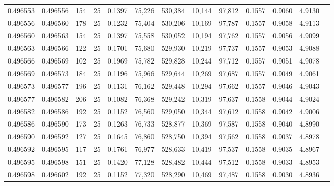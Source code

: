 \begin{tabular}{rrrrrrrrrrrrr}
0.496553 & 0.496556 & 154 &  25 &                                     0.1397 &  75,226 & 530,384 &  10,144 &  97,812 & 0.1557 & 0.9060 & 4.9130 \\
0.496556 & 0.496560 & 178 &  25 &                                     0.1232 &  75,404 & 530,206 &  10,169 &  97,787 & 0.1557 & 0.9058 & 4.9113 \\
0.496560 & 0.496563 & 154 &  25 &                                     0.1397 &  75,558 & 530,052 &  10,194 &  97,762 & 0.1557 & 0.9056 & 4.9099 \\
0.496563 & 0.496566 & 122 &  25 &                                     0.1701 &  75,680 & 529,930 &  10,219 &  97,737 & 0.1557 & 0.9053 & 4.9088 \\
0.496566 & 0.496569 & 102 &  25 &                                     0.1969 &  75,782 & 529,828 &  10,244 &  97,712 & 0.1557 & 0.9051 & 4.9078 \\
0.496569 & 0.496573 & 184 &  25 &                                     0.1196 &  75,966 & 529,644 &  10,269 &  97,687 & 0.1557 & 0.9049 & 4.9061 \\
0.496573 & 0.496577 & 196 &  25 &                                     0.1131 &  76,162 & 529,448 &  10,294 &  97,662 & 0.1557 & 0.9046 & 4.9043 \\
0.496577 & 0.496582 & 206 &  25 &                                     0.1082 &  76,368 & 529,242 &  10,319 &  97,637 & 0.1558 & 0.9044 & 4.9024 \\
0.496582 & 0.496586 & 192 &  25 &                                     0.1152 &  76,560 & 529,050 &  10,344 &  97,612 & 0.1558 & 0.9042 & 4.9006 \\
0.496586 & 0.496590 & 173 &  25 &                                     0.1263 &  76,733 & 528,877 &  10,369 &  97,587 & 0.1558 & 0.9040 & 4.8990 \\
0.496590 & 0.496592 & 127 &  25 &                                     0.1645 &  76,860 & 528,750 &  10,394 &  97,562 & 0.1558 & 0.9037 & 4.8978 \\
0.496592 & 0.496595 & 117 &  25 &                                     0.1761 &  76,977 & 528,633 &  10,419 &  97,537 & 0.1558 & 0.9035 & 4.8967 \\
0.496595 & 0.496598 & 151 &  25 &                                     0.1420 &  77,128 & 528,482 &  10,444 &  97,512 & 0.1558 & 0.9033 & 4.8953 \\
0.496598 & 0.496602 & 192 &  25 &                                     0.1152 &  77,320 & 528,290 &  10,469 &  97,487 & 0.1558 & 0.9030 & 4.8936 \\

\end{tabular}

